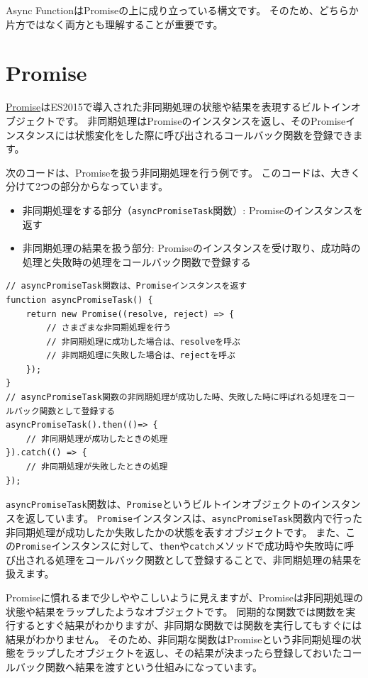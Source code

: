 Async FunctionはPromiseの上に成り立っている構文です。
そのため、どちらか片方ではなく両方とも理解することが重要です。

\hypertarget{promise}{%
\section[Promise]{Promise\,\protect{}}\label{promise}}

\href{https://developer.mozilla.org/ja/docs/Web/JavaScript/Reference/Global_Objects/Promise}{Promise}はES2015で導入された非同期処理の状態や結果を表現するビルトインオブジェクトです。
非同期処理はPromiseのインスタンスを返し、そのPromiseインスタンスには状態変化をした際に呼び出されるコールバック関数を登録できます。

次のコードは、Promiseを扱う非同期処理を行う例です。
このコードは、大きく分けて2つの部分からなっています。

\begin{itemize}
\item
  非同期処理をする部分（\texttt{asyncPromiseTask}関数）: Promiseのインスタンスを返す
\item
  非同期処理の結果を扱う部分: Promiseのインスタンスを受け取り、成功時の処理と失敗時の処理をコールバック関数で登録する
\end{itemize}

\begin{lstlisting}
// asyncPromiseTask関数は、Promiseインスタンスを返す
function asyncPromiseTask() {
    return new Promise((resolve, reject) => {
        // さまざまな非同期処理を行う
        // 非同期処理に成功した場合は、resolveを呼ぶ
        // 非同期処理に失敗した場合は、rejectを呼ぶ
    });
}
// asyncPromiseTask関数の非同期処理が成功した時、失敗した時に呼ばれる処理をコールバック関数として登録する
asyncPromiseTask().then(()=> {
    // 非同期処理が成功したときの処理
}).catch(() => {
    // 非同期処理が失敗したときの処理
});
\end{lstlisting}

\texttt{asyncPromiseTask}関数は、\texttt{Promise}というビルトインオブジェクトのインスタンスを返しています。
\texttt{Promise}インスタンスは、\texttt{asyncPromiseTask}関数内で行った非同期処理が成功したか失敗したかの状態を表すオブジェクトです。
 また、この\texttt{Promise}インスタンスに対して、\texttt{then}や\texttt{catch}メソッドで成功時や失敗時に呼び出される処理をコールバック関数として登録することで、非同期処理の結果を扱えます。

Promiseに慣れるまで少しややこしいように見えますが、Promiseは非同期処理の状態や結果をラップしたようなオブジェクトです。
同期的な関数では関数を実行するとすぐ結果がわかりますが、非同期な関数では関数を実行してもすぐには結果がわかりません。
そのため、非同期な関数はPromiseという非同期処理の状態をラップしたオブジェクトを返し、その結果が決まったら登録しておいたコールバック関数へ結果を渡すという仕組みになっています。

